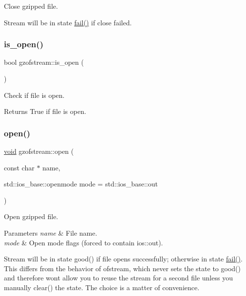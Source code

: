 Close gzipped file. 

Stream will be in state \hyperlink{_constraint_macros_8h_a73a3b169ac8c3419cbe15327e75ffcfd}{fail()} if close failed. \mbox{\label{classgzofstream_acb1c9c6dccaf41bc5e44c2263ea48de3}} 
\subsubsection{\texorpdfstring{is\+\_\+open()}{is\_open()}}
{\footnotesize\ttfamily bool gzofstream\+::is\+\_\+open (\begin{DoxyParamCaption}{ }\end{DoxyParamCaption})\hspace{0.3cm}{\ttfamily [inline]}}



Check if file is open. 

\begin{DoxyReturn}{Returns}
True if file is open. 
\end{DoxyReturn}
\mbox{\label{classgzofstream_aee3eb31f07eda7f5ad1f60d59ea4b239}} 
\subsubsection{\texorpdfstring{open()}{open()}}
{\footnotesize\ttfamily \hyperlink{lp__lib_8h_ac7828c7b2b31d2e11af17bdb6289c5d9}{void} gzofstream\+::open (\begin{DoxyParamCaption}\item[{const char $\ast$}]{name,  }\item[{std\+::ios\+\_\+base\+::openmode}]{mode = {\ttfamily std\+:\+:ios\+\_\+base\+:\+:out} }\end{DoxyParamCaption})}



Open gzipped file. 


\begin{DoxyParams}{Parameters}
{\em name} & File name. \\
\hline
{\em mode} & Open mode flags (forced to contain ios\+::out).\\
\hline
\end{DoxyParams}
Stream will be in state good() if file opens successfully; otherwise in state \hyperlink{_constraint_macros_8h_a73a3b169ac8c3419cbe15327e75ffcfd}{fail()}. This differs from the behavior of ofstream, which never sets the state to good() and therefore won\textquotesingle{}t allow you to reuse the stream for a second file unless you manually clear() the state. The choice is a matter of convenience. \mbox{\label{classgzofstream_a2fef74202b114357f41cfeb28f1d2acc}} 
